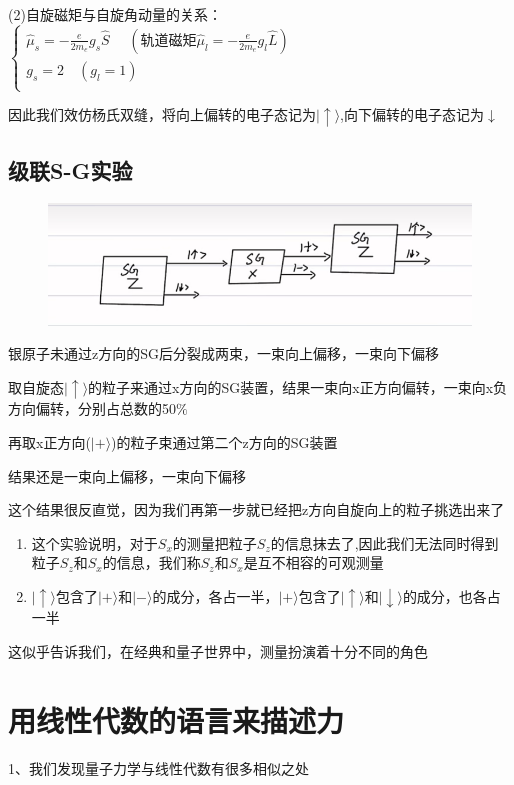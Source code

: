 \documentclass[lang=cn,10pt]{elegantbook}
\begin{document}
(2)自旋磁矩与自旋角动量的关系：
$\begin{cases}
	\widehat{\mu }_s=-\frac{e}{2m_e}g_s\hat{S}\,\,\quad \left( \text{轨道磁矩} \widehat{\mu }_l=-\frac{e}{2m_e}g_l\hat{L} \right)\\
	g_s=2\quad  \left( g_l=1 \right)\\
\end{cases}$

因此我们效仿杨氏双缝，将向上偏转的电子态记为$|\uparrow \rangle $,向下偏转的电子态记为$\downarrow$

\subsection{级联S-G实验}
\begin{figure}[H]
	\centering
	\includegraphics[width=0.7\linewidth]{figure/screenshot0016}
\end{figure}

银原子未通过z方向的SG后分裂成两束，一束向上偏移，一束向下偏移

取自旋态$|\uparrow \rangle $的粒子来通过x方向的SG装置，结果一束向x正方向偏转，一束向x负方向偏转，分别占总数的50$\%$

再取x正方向($|+ \rangle $)的粒子束通过第二个z方向的SG装置

结果还是一束向上偏移，一束向下偏移

这个结果很反直觉，因为我们再第一步就已经把z方向自旋向上的粒子挑选出来了

\begin{enumerate}
	\item  这个实验说明，对于$S_x$的测量把粒子$S_z$的信息抹去了,因此我们无法同时得到粒子$S_z$和$S_x$的信息，我们称$S_z$和$S_x$是互不相容的可观测量
	\item  $|\uparrow \rangle $包含了$|+ \rangle $和$|- \rangle $的成分，各占一半，$|+ \rangle $包含了$|\uparrow \rangle $和$|\downarrow \rangle $的成分，也各占一半
\end{enumerate}
这似乎告诉我们，在经典和量子世界中，测量扮演着十分不同的角色

\section{用线性代数的语言来描述力}
1、我们发现量子力学与线性代数有很多相似之处
\end{document}
